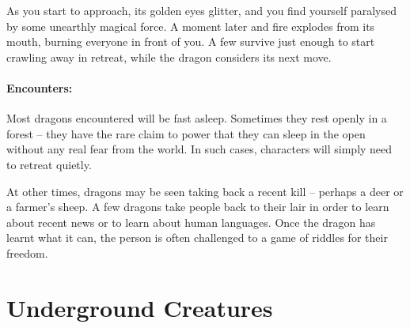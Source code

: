 \begin{multicols}{2}
\begin{boxtext}

	As you start to approach, its golden eyes glitter, and you find yourself paralysed by some unearthly magical force.
A moment later and fire explodes from its mouth, burning everyone in front of you.
	A few survive just enough to start crawling away in retreat, while the dragon considers its next move.

\end{boxtext}

\paragraph{Encounters:} Most dragons encountered will be fast asleep.
Sometimes they rest openly in a forest -- they have the rare claim to power that they can sleep in the open without any real fear from the world.
In such cases, characters will simply need to retreat quietly.

At other times, dragons may be seen taking back a recent kill -- perhaps a deer or a farmer's sheep.
A few dragons take people back to their lair in order to learn about recent news or to learn about human languages.
Once the dragon has learnt what it can, the person is often challenged to a game of riddles for their freedom.  

\dragon

\end{multicols}

\section{Underground Creatures}

